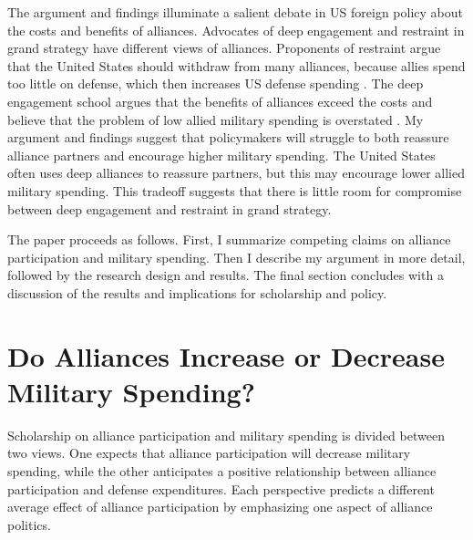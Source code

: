\documentclass[12pt]{article}
\begin{document}
The argument and findings illuminate a salient debate in US foreign policy about the costs and benefits of alliances. 
Advocates of deep engagement \citep{Brooksetal2013} and restraint \citep{Posen2014} in grand strategy have different views of alliances. 
Proponents of restraint argue that the United States should withdraw from many alliances, because allies spend too little on defense, which then increases US defense spending \citep{Preble2009}.
The deep engagement school argues that the benefits of alliances exceed the costs and believe that the problem of low allied military spending is overstated \citep{BrandsFeaver2017}. 
My argument and findings suggest that policymakers will struggle to both reassure alliance partners and encourage higher military spending. 
The United States often uses deep alliances to reassure partners, but this may encourage lower allied military spending. 
This tradeoff suggests that there is little room for compromise between deep engagement and restraint in grand strategy.  


The paper proceeds as follows. 
First, I summarize competing claims on alliance participation and military spending. 
Then I describe my argument in more detail, followed by the research design and results. 
The final section concludes with a discussion of the results and implications for scholarship and policy.  



\section{Do Alliances Increase or Decrease Military Spending?}


Scholarship on alliance participation and military spending is divided between two views.
One expects that alliance participation will decrease military spending, while the other anticipates a positive relationship between alliance participation and defense expenditures. 
Each perspective predicts a different average effect of alliance participation by emphasizing one aspect of alliance politics.   
\end{document}

